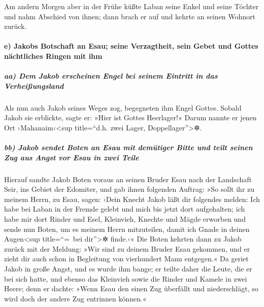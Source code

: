  Am andern Morgen aber in der Frühe küßte Laban seine
Enkel und seine Töchter und nahm Abschied von ihnen; dann brach er auf
und kehrte an seinen Wohnort zurück.

\hypertarget{e-jakobs-botschaft-an-esau-seine-verzagtheit-sein-gebet-und-gottes-nuxe4chtliches-ringen-mit-ihm}{%
\paragraph{e) Jakobs Botschaft an Esau; seine Verzagtheit, sein Gebet
und Gottes nächtliches Ringen mit
ihm}\label{e-jakobs-botschaft-an-esau-seine-verzagtheit-sein-gebet-und-gottes-nuxe4chtliches-ringen-mit-ihm}}

\hypertarget{aa-dem-jakob-erscheinen-engel-bei-seinem-eintritt-in-das-verheiuxdfungsland}{%
\subparagraph{aa) Dem Jakob erscheinen Engel bei seinem Eintritt in das
Verheißungsland}\label{aa-dem-jakob-erscheinen-engel-bei-seinem-eintritt-in-das-verheiuxdfungsland}}

 Als nun auch Jakob seines Weges zog, begegneten ihm Engel
Gottes.  Sobald Jakob sie erblickte, sagte er: »Hier ist
Gottes Heerlager!« Darum nannte er jenen Ort ›Mahanaim‹\textless sup
title=``d.h. zwei Lager, Doppellager''\textgreater✲.

\hypertarget{bb-jakob-sendet-boten-an-esau-mit-demuxfctiger-bitte-und-teilt-seinen-zug-aus-angst-vor-esau-in-zwei-teile}{%
\subparagraph{bb) Jakob sendet Boten an Esau mit demütiger Bitte und
teilt seinen Zug aus Angst vor Esau in zwei
Teile}\label{bb-jakob-sendet-boten-an-esau-mit-demuxfctiger-bitte-und-teilt-seinen-zug-aus-angst-vor-esau-in-zwei-teile}}

 Hierauf sandte Jakob Boten voraus an seinen Bruder Esau
nach der Landschaft Seir, ins Gebiet der Edomiter,  und
gab ihnen folgenden Auftrag: »So sollt ihr zu meinem Herrn, zu Esau,
sagen: ›Dein Knecht Jakob läßt dir folgendes melden: Ich habe bei Laban
in der Fremde gelebt und mich bis jetzt dort aufgehalten; 
ich habe mir dort Rinder und Esel, Kleinvieh, Knechte und Mägde erworben
und sende nun Boten, um es meinem Herrn mitzuteilen, damit ich Gnade in
deinen Augen\textless sup title=``=~bei dir''\textgreater✲ finde.‹«
 Die Boten kehrten dann zu Jakob zurück mit der Meldung:
»Wir sind zu deinem Bruder Esau gekommen, und er zieht dir auch schon in
Begleitung von vierhundert Mann entgegen.«  Da geriet
Jakob in große Angst, und es wurde ihm bange; er teilte daher die Leute,
die er bei sich hatte, und ebenso das Kleinvieh sowie die Rinder und
Kamele in zwei Heere;  denn er dachte: »Wenn Esau den
einen Zug überfällt und niederschlägt, so wird doch der andere Zug
entrinnen können.«

